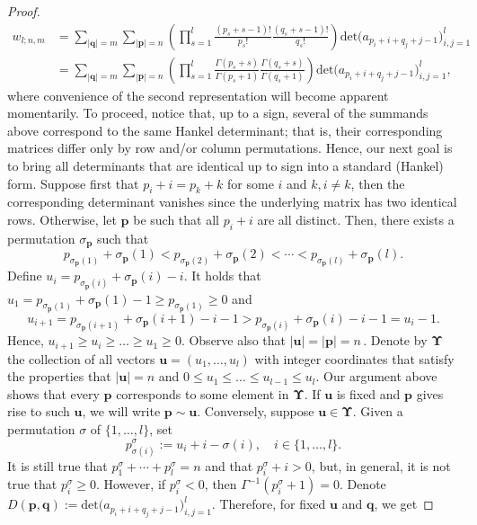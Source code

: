 \documentclass[twoside,a4paper]{amsart}
\renewcommand{\det}{\mathrm{det}}
\def\ge{\geqslant}
\def\le{\leqslant}
\theoremstyle{remark}
\begin{document}
\begin{proof}
\begin{align}
w_{l;n,m} &= \sum_{|\boldsymbol q|=m}\sum_{|\boldsymbol p|=n} \left(\prod_{s=1}^l \frac{(p_s+s-1)!}{p_s!}\frac{(q_s+s-1)!}{q_s!}\right) \det\big(a_{p_i+i+q_j+j-1}\big)_{i,j=1}^l \\
\label{wnm}
& = \sum_{|\boldsymbol q|=m}\sum_{|\boldsymbol p|=n} \left(\prod_{s=1}^l \frac{\Gamma(p_s+s)}{\Gamma(p_s+1)}\frac{\Gamma(q_s+s)}{\Gamma(q_s+1)}\right) \det\big(a_{p_i+i+q_j+j-1}\big)_{i,j=1}^l,
\end{align}
where convenience of the second representation will become apparent momentarily. To proceed,  notice that, up to a sign, several of the summands above correspond to the same Hankel determinant; that is, their corresponding matrices differ only by row and/or column permutations. Hence, our next goal is to bring all determinants that are identical up to sign into a standard (Hankel) form. Suppose first that \( p_i+i=p_k+k \) for some \( i \) and \( k, i\neq k \), then the corresponding determinant vanishes since the underlying matrix has two identical rows. Otherwise, let \( \boldsymbol p \) be such that all \( p_i+i \) are all distinct. Then, there exists a permutation \( \sigma_{\boldsymbol p} \) such that
\[
p_{\sigma_{\boldsymbol p}(1)}+\sigma_{\boldsymbol p}(1)<p_{\sigma_{\boldsymbol p}(2)}+\sigma_{\boldsymbol p}(2)< \cdots < p_{\sigma_{\boldsymbol p}(l)}+\sigma_{\boldsymbol p}(l).
\]
Define \( u_i = p_{\sigma_{\boldsymbol p}(i)}+\sigma_{\boldsymbol p}(i)-i \). It holds that \( u_1 = p_{\sigma_{\boldsymbol p}(1)}+\sigma_{\boldsymbol p}(1)-1\geq p_{\sigma_{\boldsymbol p}(1)} \geq 0 \) and
\[
u_{i+1} = p_{\sigma_{\boldsymbol p}(i+1)}+\sigma_{\boldsymbol p}(i+1)-i - 1 > p_{\sigma_{\boldsymbol p}(i)}+\sigma_{\boldsymbol p}(i)-i -1 = u_i - 1.
\]
Hence, \( u_{i+1}\geq u_i\geq \ldots \ge u_1\geq 0 \). Observe also that
$
|\boldsymbol u|=|\boldsymbol p|=n\,.
$
Denote by $\boldsymbol \Upsilon$ the collection of all vectors $\boldsymbol u=(u_1,\ldots,u_l)$ with integer coordinates that satisfy the properties that $|\boldsymbol u|=n$ and {$0\le u_1\le \ldots \le u_{l-1}\le u_{l}$.} Our argument above shows that every $\boldsymbol p$ corresponds to some element in $\boldsymbol \Upsilon$. If $\boldsymbol u$ is fixed and $\boldsymbol p$ gives rise to such $\boldsymbol u$, we will write 
\( \boldsymbol p\sim \boldsymbol u \). Conversely, suppose \( \boldsymbol u \in \boldsymbol \Upsilon\). Given a permutation \( \sigma \) of \( \{1,\ldots,l\} \), set
\[
p_{\sigma(i)}^\sigma := u_i+i-\sigma(i), \quad i\in\{1,\ldots,l\}.
\]
It is still true that \( p_1^\sigma+\cdots +p_l^\sigma = n \) and that \( p_i^\sigma+i>0 \), but, in general, it is not true that \( p_i^\sigma\geq0 \). However, if \( p_i^\sigma<0 \), then \( \Gamma^{-1}(p_i^\sigma+1)=0 \). Denote \( D(\boldsymbol p,\boldsymbol q) := \det\big(a_{p_i+i+q_j+j-1}\big)_{i,j=1}^l \). Therefore, for fixed $\boldsymbol u$ and $\boldsymbol q$, we get 

\end{proof}
\end{document}
